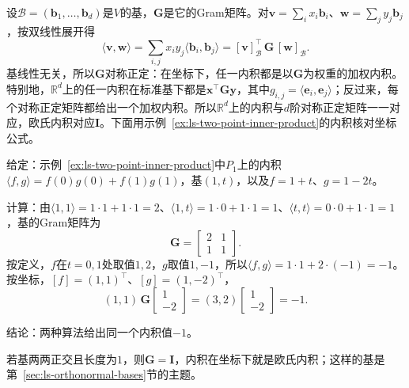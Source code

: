 设$\mathcal B=(\bm b_1,\ldots,\bm b_d)$是$V$的基，$\bm G$是它的Gram矩阵。对$\bm v=\sum_ix_i\bm b_i$、$\bm w=\sum_jy_j\bm b_j$，按双线性展开得
\[
 \langle\bm v,\bm w\rangle=\sum_{i,j}x_iy_j\langle\bm b_i,\bm b_j\rangle=[\bm v]_{\mathcal B}^\top\,\bm G\,[\bm w]_{\mathcal B}.
\]
基线性无关，所以$\bm G$对称正定：在坐标下，任一内积都是以$\bm G$为权重的加权内积。特别地，$\mathbb R^d$上的任一内积在标准基下都是$\bm x^\top\bm G\bm y$，其中$g_{i,j}=\langle\bm e_i,\bm e_j\rangle$；反过来，每个对称正定矩阵都给出一个加权内积。所以$\mathbb R^d$上的内积与$d$阶对称正定矩阵一一对应，欧氏内积对应$\bm I$。下面用示例~\ref{ex:ls-two-point-inner-product}的内积核对坐标公式。
\begin{example}[两点内积的坐标计算]
\label{ex:ls-two-point-inner-product-coordinates}
给定：示例~\ref{ex:ls-two-point-inner-product}中$P_1$上的内积$\langle f,g\rangle=f(0)g(0)+f(1)g(1)$，基$(1,t)$，以及$f=1+t$、$g=1-2t$。

计算：由$\langle1,1\rangle=1\cdot1+1\cdot1=2$、$\langle1,t\rangle=1\cdot0+1\cdot1=1$、$\langle t,t\rangle=0\cdot0+1\cdot1=1$，基的Gram矩阵为
\[
 \bm G=\begin{bmatrix}2&1\\1&1\end{bmatrix}.
\]
按定义，$f$在$t=0,1$处取值$1,2$，$g$取值$1,-1$，所以$\langle f,g\rangle=1\cdot1+2\cdot(-1)=-1$。按坐标，$[f]=(1,1)^\top$、$[g]=(1,-2)^\top$，
\[
 (1,1)\,\bm G\begin{bmatrix}1\\-2\end{bmatrix}=(3,2)\begin{bmatrix}1\\-2\end{bmatrix}=-1 .
\]

结论：两种算法给出同一个内积值$-1$。
\end{example}
若基两两正交且长度为$1$，则$\bm G=\bm I$，内积在坐标下就是欧氏内积；这样的基是第~\ref{sec:ls-orthonormal-bases}节的主题。

